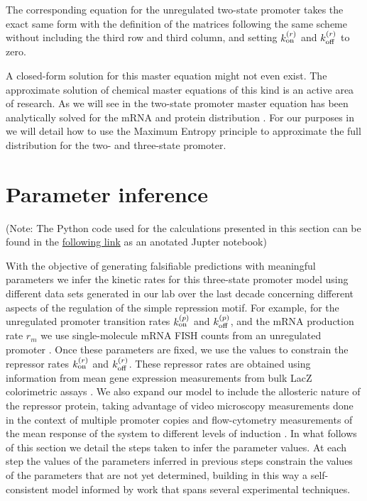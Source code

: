 The corresponding equation for the unregulated two-state promoter takes the
exact same form with the definition of the matrices following the same scheme
without including the third row and third column, and setting $k^{(r)}_{\text{on}}$ and
$k^{(r)}_{\text{off}}$ to zero.

A closed-form solution for this master equation might not even exist. The
approximate solution of chemical master equations of this kind is an active area
of research. As we will see in  the two-state
promoter master equation has been analytically solved for the mRNA
\cite{Peccoud1995} and protein distribution \cite{Shahrezaei2008}. For our
purposes in  we will detail how to use the Maximum Entropy
principle to approximate the full distribution for the two- and three-state
promoter.

\section{Parameter inference}\label{supp_param_inference}

(Note: The Python code used for the calculations presented in this section can
be found in the
\href{https://www.rpgroup.caltech.edu/chann_cap/src/theory/html/chemical_master_mRNA_FISH_mcmc.html}{following
link} as an anotated Jupter notebook)

With the objective of generating falsifiable predictions with meaningful
parameters we infer the kinetic rates for this three-state promoter model using
different data sets generated in our lab over the last decade concerning
different aspects of the regulation of the simple repression motif. For example,
for the unregulated promoter transition rates $k^{(p)}_{\text{on}}$ and $k^{(p)}_{\text{off}}$, and the mRNA
production rate $r_m$ we use single-molecule mRNA FISH counts from an
unregulated promoter \cite{Jones2014a}. Once these parameters are fixed, we use
the values to constrain the repressor rates $k^{(r)}_{\text{on}}$ and $k^{(r)}_{\text{off}}$. These
repressor rates are obtained using information from mean gene expression
measurements from bulk LacZ colorimetric assays \cite{Garcia2011c}. We also
expand our model to include the allosteric nature of the repressor protein,
taking advantage of video microscopy measurements done in the context of
multiple promoter copies \cite{Brewster2014} and flow-cytometry measurements of
the mean response of the system to different levels of induction
\cite{Razo-Mejia2018}. In what follows of this section we detail the steps taken
to infer the parameter values. At each step the values of the parameters
inferred in previous steps constrain the values of the parameters that are not
yet determined, building in this way a self-consistent model informed by work
that spans several experimental techniques.

